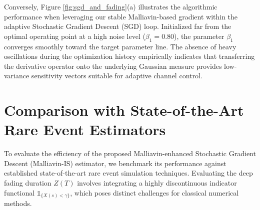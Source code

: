 \documentclass[11pt]{article}
\begin{document}
Conversely, Figure \ref{fig:sgd_and_fading}(a) illustrates the algorithmic performance when leveraging our stable Malliavin-based gradient within the adaptive Stochastic Gradient Descent (SGD) loop. Initialized far from the optimal operating point at a high noise level ($\beta_1 = 0.80$), the parameter $\beta_1$ converges smoothly toward the target parameter line. The absence of heavy oscillations during the optimization history empirically indicates that transferring the derivative operator onto the underlying Gaussian measure provides low-variance sensitivity vectors suitable for adaptive channel control.

\section{Comparison with State-of-the-Art Rare Event Estimators}\label{sec:comparison}

To evaluate the efficiency of the proposed Malliavin-enhanced Stochastic Gradient Descent (Malliavin-IS) estimator, we benchmark its performance against established state-of-the-art rare event simulation techniques. Evaluating the deep fading duration $Z(T)$ involves integrating a highly discontinuous indicator functional $\mathds{1}_{\{X(s) < \gamma\}}$, which poses distinct challenges for classical numerical methods.
\end{document}

